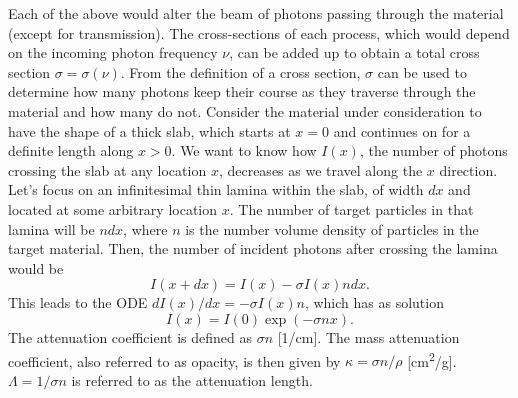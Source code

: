 \documentclass[a4paper,11pt]{article}
\begin{document}
Each of the above would alter the beam of photons passing through the material (except for transmission). The cross-sections of each process, which would depend on the incoming photon frequency $\nu$, can be added up to obtain a total cross section $\sigma = \sigma(\nu)$. From the definition of a cross section, $\sigma$ can be used to determine how many photons keep their course as they traverse through the material and how many do not. Consider the material under consideration to have the shape of a thick slab, which starts at $x=0$ and continues on for a definite length along $x>0$. We want to know how $I(x)$, the number of photons crossing the slab at any location $x$, decreases as we travel along the $x$ direction. Let's focus on an infinitesimal thin lamina within the slab, of width $dx$ and located at some arbitrary location $x$. The number of target particles in that lamina will be $n dx$, where $n$ is the number volume density of particles in the target material. Then, the number of incident photons after crossing the lamina would be
\begin{equation}
    I(x+dx) = I(x) -\sigma I(x) n dx.
\end{equation}
This leads to the ODE $dI(x)/dx = -\sigma I(x) n$, which has as solution
\begin{equation}
    I(x) = I(0) \exp(-\sigma n x).
\end{equation}
The attenuation coefficient is defined as $\sigma n$ [1/cm]. The mass attenuation coefficient, also referred to as opacity, is then given by $\kappa = \sigma n / \rho$ [cm\textsuperscript{2}/g]. $\Lambda = 1 / \sigma n$ is referred to as the attenuation length. 
\end{document}
